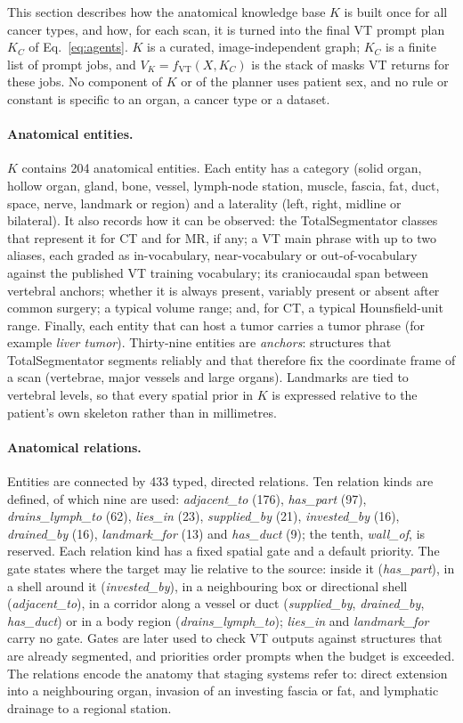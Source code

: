 \documentclass[fleqn,10pt]{olplainarticle}
\begin{document}
This section describes how the anatomical knowledge base $K$ is built once for all cancer types, and how, for each scan,
it is turned into the final VT prompt plan $K_C$ of Eq.~\eqref{eq:agents}. $K$ is a curated, image-independent graph;
$K_C$ is a finite list of prompt jobs, and $V_K=f_{\mathrm{VT}}(X,K_C)$ is the stack of masks VT returns for these jobs.
No component of $K$ or of the planner uses patient sex, and no rule or constant is specific to an organ, a cancer type
or a dataset.

\paragraph{Anatomical entities.}
$K$ contains 204 anatomical entities. Each entity has a category (solid organ, hollow organ, gland, bone, vessel,
lymph-node station, muscle, fascia, fat, duct, space, nerve, landmark or region) and a laterality (left, right, midline
or bilateral). It also records how it can be observed: the TotalSegmentator classes that represent it for CT and for
MR, if any; a VT main phrase with up to two aliases, each graded as in-vocabulary, near-vocabulary or
out-of-vocabulary against the published VT training vocabulary; its craniocaudal span between vertebral anchors;
whether it is always present, variably present or absent after common surgery; a typical volume range; and, for CT, a
typical Hounsfield-unit range. Finally, each entity that can host a tumor carries a tumor phrase (for example
\emph{liver tumor}). Thirty-nine entities are \emph{anchors}: structures that TotalSegmentator segments reliably and
that therefore fix the coordinate frame of a scan (vertebrae, major vessels and large organs). Landmarks are tied to
vertebral levels, so that every spatial prior in $K$ is expressed relative to the patient's own skeleton rather than in
millimetres.

\paragraph{Anatomical relations.}
Entities are connected by 433 typed, directed relations. Ten relation kinds are defined, of which nine are used:
\emph{adjacent\_to} (176), \emph{has\_part} (97), \emph{drains\_lymph\_to} (62), \emph{lies\_in} (23),
\emph{supplied\_by} (21), \emph{invested\_by} (16), \emph{drained\_by} (16), \emph{landmark\_for} (13) and
\emph{has\_duct} (9); the tenth, \emph{wall\_of}, is reserved. Each relation kind has a fixed spatial gate and a default
priority. The gate states where the target may lie relative to the source: inside it (\emph{has\_part}), in a shell
around it (\emph{invested\_by}), in a neighbouring box or directional shell (\emph{adjacent\_to}), in a corridor along
a vessel or duct (\emph{supplied\_by}, \emph{drained\_by}, \emph{has\_duct}) or in a body region
(\emph{drains\_lymph\_to}); \emph{lies\_in} and \emph{landmark\_for} carry no gate. Gates are later used to check VT
outputs against structures that are already segmented, and priorities order prompts when the budget is exceeded. The relations encode the anatomy that staging systems refer to: direct extension
into a neighbouring organ, invasion of an investing fascia or fat, and lymphatic drainage to a regional station.
\end{document}
